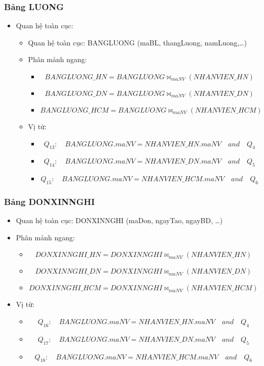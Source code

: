 \documentclass[a4paper,12pt]{report}
\begin{document}
\subsubsection{Bảng LUONG}
\begin{itemize}
    \item Quan hệ toàn cục: \begin{itemize}
        \item Quan hệ toàn cục: BANGLUONG (maBL, thangLuong, namLuong,\ldots)
        \item Phân mảnh ngang:
            \begin{itemize}[label=]
                \item \[BANGLUONG\_HN = BANGLUONG \bowtie_{maNV}(NHANVIEN\_HN)\]
                \item \[BANGLUONG\_DN = BANGLUONG \bowtie_{maNV}(NHANVIEN\_DN)\]
                \item \[BANGLUONG\_HCM = BANGLUONG \bowtie_{maNV}(NHANVIEN\_HCM)\]
            \end{itemize}
        \item Vị từ:
        \begin{itemize}[label=]
            \item \[Q_{13}\colon\quad BANGLUONG.maNV = NHANVIEN\_HN.maNV \quad and \quad Q_4\]
            \item \[Q_{14}\colon\quad BANGLUONG.maNV = NHANVIEN\_DN.maNV \quad and \quad Q_5 \]
            \item \[Q_{15}\colon\quad BANGLUONG.maNV = NHANVIEN\_HCM.maNV \quad and \quad Q_6\]
        \end{itemize}
    \end{itemize}
\end{itemize}
\subsubsection{Bảng DONXINNGHI}
\begin{itemize}
    \item Quan hệ toàn cục: DONXINNGHI (maDon, ngayTao, ngayBD, \ldots)
    \item Phân mảnh ngang:
        \begin{itemize}[label=]
            \item \[DONXINNGHI\_HN = DONXINNGHI \bowtie_{maNV}(NHANVIEN\_HN)\]
            \item \[DONXINNGHI\_DN = DONXINNGHI \bowtie_{maNV}(NHANVIEN\_DN)\]
            \item \[DONXINNGHI\_HCM = DONXINNGHI \bowtie_{maNV}(NHANVIEN\_HCM)\]
        \end{itemize}
    \item Vị từ:
    \begin{itemize}[label=]
        \item \[Q_{16}\colon\quad BANGLUONG.maNV = NHANVIEN\_HN.maNV \quad and \quad Q_4\]
        \item \[Q_{17}\colon\quad BANGLUONG.maNV = NHANVIEN\_DN.maNV \quad and \quad Q_5 \]
        \item \[Q_{18}\colon\quad BANGLUONG.maNV = NHANVIEN\_HCM.maNV \quad and \quad Q_6\]
    \end{itemize}
\end{itemize}
\end{document}

